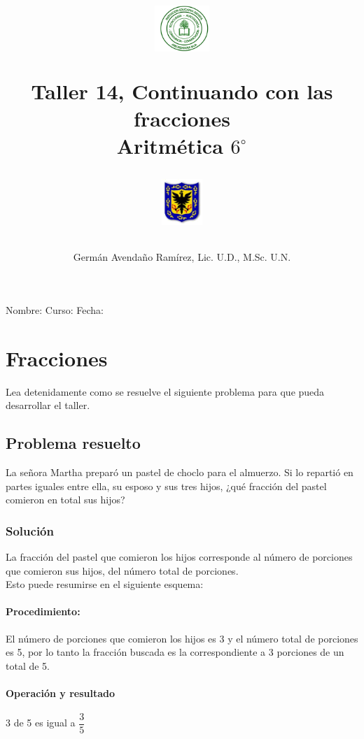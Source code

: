 \documentclass[10pt,twoside]{article}
\author{Germ\'an Avenda\~no Ram\'irez, Lic. U.D., M.Sc. U.N.}
\title{\begin{minipage}{.2\textwidth}
\includegraphics[height=1.75cm]{Images/logo-colegio.png}\end{minipage}
\begin{minipage}{.55\textwidth}
\begin{center}
Taller 14, Continuando con las fracciones \\
Aritmética $6^{\circ}$
\end{center}
\end{minipage}\hfill
\begin{minipage}{.2\textwidth}
\includegraphics[height=1.75cm]{Images/logo-sed.png} 
\end{minipage}}
\date{}
\begin{document}
\maketitle
Nombre: \hrulefill Curso: \underline{\hspace*{44pt}} Fecha: \underline{\hspace*{2.5cm}}
\section*{Fracciones}
Lea detenidamente como se resuelve el siguiente problema para que pueda desarrollar el taller.
\subsection*{Problema resuelto}
La señora Martha prepar\'{o} un pastel de choclo para el almuerzo. Si lo reparti\'{o} en partes iguales entre ella, su esposo y sus tres hijos, ¿qu\'{e} fracci\'{o}n del pastel comieron en total sus hijos?
\subsubsection*{Soluci\'{o}n}
La fracci\'{o}n del pastel que comieron los hijos corresponde al n\'{u}mero de porciones que comieron sus hijos, del n\'{u}mero total de porciones.\\
Esto puede resumirse en el siguiente esquema:
\paragraph*{Procedimiento:}
El n\'{u}mero de porciones que comieron los hijos es 3 y el n\'{u}mero total de porciones es 5, por lo tanto la fracci\'{o}n buscada es la correspondiente a 3 porciones de un total de 5.
\paragraph*{Operaci\'{o}n y resultado}
3 de 5 es igual a \hspace*{.5cm} $\dfrac{3}{5}$
\end{document}
